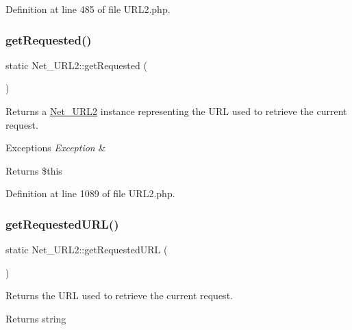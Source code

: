 Definition at line 485 of file U\+R\+L2.\+php.

\mbox{\label{classNet__URL2_a57c171f9507f78aafbaba695f1220273}} 
\subsubsection{\texorpdfstring{get\+Requested()}{getRequested()}}
{\footnotesize\ttfamily static Net\+\_\+\+U\+R\+L2\+::get\+Requested (\begin{DoxyParamCaption}{ }\end{DoxyParamCaption})\hspace{0.3cm}{\ttfamily [static]}}

Returns a \hyperlink{classNet__URL2}{Net\+\_\+\+U\+R\+L2} instance representing the U\+RL used to retrieve the current request.


\begin{DoxyExceptions}{Exceptions}
{\em Exception} & \\
\hline
\end{DoxyExceptions}
\begin{DoxyReturn}{Returns}
\$this 
\end{DoxyReturn}


Definition at line 1089 of file U\+R\+L2.\+php.

\mbox{\label{classNet__URL2_acc74a73bb075b3a500ded81b63799d59}} 
\subsubsection{\texorpdfstring{get\+Requested\+U\+R\+L()}{getRequestedURL()}}
{\footnotesize\ttfamily static Net\+\_\+\+U\+R\+L2\+::get\+Requested\+U\+RL (\begin{DoxyParamCaption}{ }\end{DoxyParamCaption})\hspace{0.3cm}{\ttfamily [static]}}

Returns the U\+RL used to retrieve the current request.

\begin{DoxyReturn}{Returns}
string 
\end{DoxyReturn}


